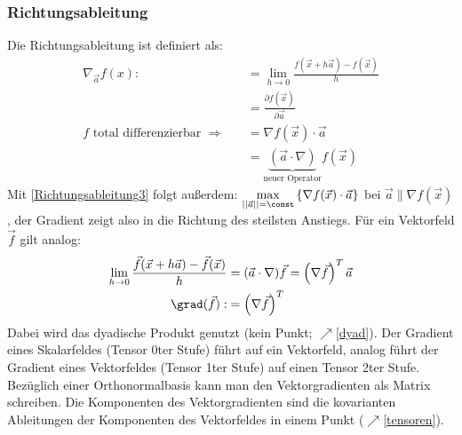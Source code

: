 	  \subsubsection{Richtungsableitung}
	  Die Richtungsableitung ist definiert als:
	  \begin{align}
	  	\nabla_{\vec{a}} f(x):&=\lim\limits_{h\to 0}\frac{f(\vec{x}+h\vec{a})-f(\vec{x})}{h}\\
	  	&=\frac{\partial f(\vec{x})}{\partial \vec{a}}\\
	  f	\text{ total differenzierbar }\Rightarrow\quad&=\nabla f(\vec{x})\cdot \vec{a}\label{Richtungsableitung3}\\
	  	&=\underbrace{(\vec{a}\cdot\nabla)}_{\text{neuer Operator}}f(\vec{x})\label{Richtungsableitung4}
	  \end{align}
	  Mit \ref{Richtungsableitung3} folgt außerdem: $\max\limits_{||\vec{a}||=\const}\left\{\nabla f(\vec{x})\cdot \vec{a}\right\}$  bei $\vec{a}\parallel\nabla f(\vec{x})$, der Gradient zeigt also in die Richtung des steilsten Anstiegs.
	  Für ein Vektorfeld $\vec{f}$ gilt analog:
	  \begin{equation}\begin{split}
	  		\lim_{h\to0}\frac{\vec f(\vec x+h\vec a)-\vec f(\vec x)}{h}&=(\vec a\cdot\nabla)\vec f=\left(\nabla  \vec{f}\right)^T\vec{a}\\
	  		\grad(\vec{f}):&=\left(\nabla \vec{f}\right)^T
	  		\end{split}  \end{equation}
  		Dabei wird das dyadische Produkt genutzt (kein Punkt; $\nearrow$\ref{dyad}). Der Gradient eines Skalarfeldes (Tensor 0ter Stufe) führt auf ein Vektorfeld, analog führt der Gradient eines Vektorfeldes (Tensor 1ter Stufe) auf einen Tensor 2ter Stufe. Bezüglich einer Orthonormalbasis kann man den Vektorgradienten als Matrix schreiben. Die Komponenten des Vektorgradienten sind die kovarianten Ableitungen der Komponenten des Vektorfeldes in einem Punkt ($\nearrow$\ref{tensoren}).
